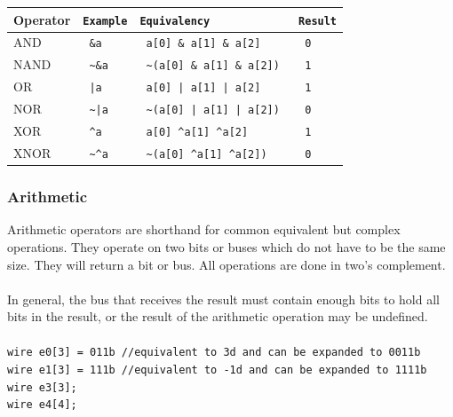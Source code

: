 \documentclass[letterpaper,11pt]{article}
\begin{document}
        \begin{center} 
        \begin{tabular}{|l|>{\texttt\bgroup}l<{\egroup}|>{\texttt\bgroup}l<{\egroup}|>{\texttt\bgroup}l<{\egroup}|}
        \hline
        Operator&Example&Equivalency&Result\\ \hline
        AND		&	\&a       	&	a[0] \& a[1] \& a[2]     &	0		\\ \hline
        NAND		&	\textasciitilde \&a      	&	\textasciitilde(a[0] \& a[1] \& a[2])  &	1		\\ \hline
        OR		&	|a       	&	a[0] | a[1] | a[2]       &	1		\\ \hline
        NOR		&	\textasciitilde |a      	&	\textasciitilde (a[0] | a[1] | a[2])    & 	0		\\ \hline
        XOR		&	\textasciicircum a 	&	a[0] \textasciicircum a[1] \textasciicircum a[2]       &	1		\\ \hline
        XNOR		&	\textasciitilde \textasciicircum a	&	\textasciitilde(a[0] \textasciicircum a[1] \textasciicircum a[2])    & 	0		\\ \hline
        \end{tabular}
        \end{center}
        
        \subsubsection{Arithmetic}
        Arithmetic operators are shorthand for common equivalent but complex operations. They operate 
        on two bits or buses which do not have to be the same size. They will return a bit or bus. All 
        operations are done in two's complement.\\\\
        In general, the bus that receives the result must contain enough bits to hold all bits 
        in the result, or the result of the arithmetic operation may be undefined.\\\\
        \texttt{wire e0[3] = 011b //equivalent to 3d and can be expanded to 0011b}\\
        \texttt{wire e1[3] = 111b //equivalent to -1d and can be expanded to 1111b}\\
        \texttt{wire e3[3];}\\
        \texttt{wire e4[4];}\\
        
\end{document}
